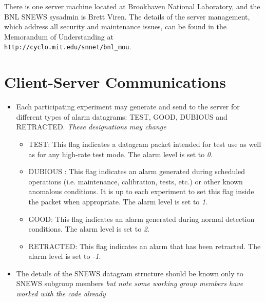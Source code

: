 \documentclass{article}
\begin{document}
There is one server machine located at Brookhaven
National Laboratory, and the BNL SNEWS sysadmin is Brett Viren.
The details of the server management, which address all
security and maintenance issues, can be found
in the Memorandum of Understanding at\\
{\tt http://cyclo.mit.edu/snnet/bnl\_mou}.

\section{Client-Server Communications}\label{alarm}
\begin{itemize}

\item Each participating experiment may generate and send to the server
for different types of alarm datagrams: TEST, GOOD, DUBIOUS and RETRACTED.
{\it These designations may change}

\begin{itemize}

\item TEST: This flag indicates a datagram packet intended for test use
as well as for any high-rate test mode.  The alarm level
is set to {\it 0}.

\item DUBIOUS : This flag indicates an alarm
generated during scheduled operations (i.e. maintenance, calibration,
tests, etc.) or other known anomalous conditions. It is up to each
experiment to set this flag inside the packet when appropriate.  The
alarm level is set to {\it 1}.

\item GOOD: This flag indicates an alarm generated during
normal detection conditions.  The alarm level is set to {\it 2}.

\item RETRACTED: This flag indicates an alarm 
that has been retracted.  The alarm level is set to {\it -1}.

\end{itemize}
 
\item The details of the SNEWS datagram structure should
be known only to SNEWS subgroup members {\it but note some
working group members have worked with the code already} 


\end{itemize}
\end{document}
